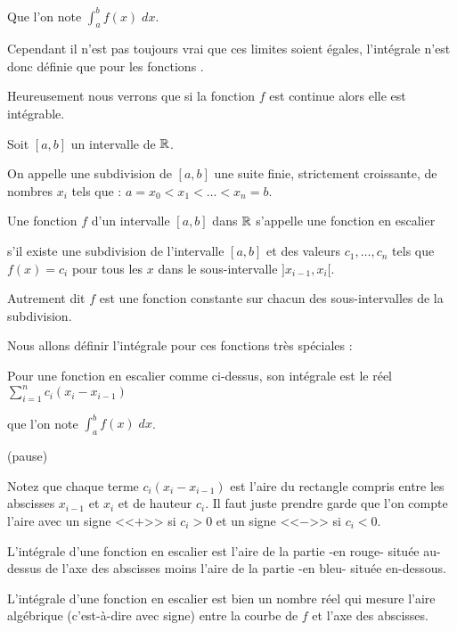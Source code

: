 \change

Que l'on note $\int_a^b f(x) \; dx$. 

\change

Cependant il n'est pas toujours vrai que ces limites soient égales, l'intégrale n'est donc 
définie que pour les fonctions .

\change

Heureusement nous verrons 
que si la fonction $f$ est continue alors elle est intégrable.


\diapo


Soit $[a,b]$ un intervalle de $\mathbb{R}$.

On appelle une subdivision de $[a,b]$ une suite finie,
strictement croissante, de nombres $x_i$ tels que :
$a=x_0< x_1<\ldots< x_n=b$.


\change

Une fonction $f$ d'un intervalle $[a,b]$ dans $\mathbb{R}$ 
s'appelle  une fonction en escalier

s'il existe  une subdivision de l'intervalle $[a,b]$ 
et des valeurs $c_1,\ldots,c_n$ tels que $f(x)=c_i$
pour tous les $x$ dans le sous-intervalle $]x_{i-1},x_i[$.

\change

Autrement dit $f$ est une fonction constante sur chacun des sous-intervalles de la subdivision.

\change

Nous allons définir l'intégrale pour ces fonctions très spéciales :

Pour une fonction en escalier comme ci-dessus, son intégrale
est le réel $\sum_{i=1}^n c_i(x_i-x_{i-1})$

que l'on note $\int_a^b f(x) \; dx$.


(pause)

\change

Notez que chaque terme $c_i(x_i-x_{i-1})$ est l'aire du rectangle compris entre les abscisses
$x_{i-1}$ et $x_i$ et de hauteur $c_i$. Il faut juste prendre garde que l'on compte l'aire 
avec un signe <<$+$>> si $c_i>0$ et un signe <<$-$>> si $c_i<0$.


L'intégrale d'une fonction en escalier est l'aire  de la partie -en rouge- située au-dessus
de l'axe des abscisses  moins l'aire de la partie -en bleu-
située en-dessous.


L'intégrale d'une fonction en escalier est bien un nombre réel qui mesure l'aire algébrique 
(c'est-à-dire avec signe) entre la courbe de $f$ et l'axe des abscisses.


